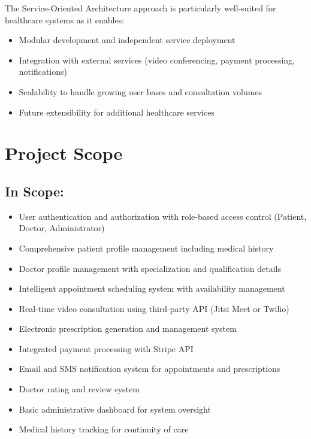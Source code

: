 \documentclass[11pt,a4paper]{article}
\begin{document}
The Service-Oriented Architecture approach is particularly well-suited for healthcare systems as it enables:
\begin{itemize}[leftmargin=*, itemsep=0.2em]
    \item Modular development and independent service deployment
    \item Integration with external services (video conferencing, payment processing, notifications)
    \item Scalability to handle growing user bases and consultation volumes
    \item Future extensibility for additional healthcare services
\end{itemize}

\section{Project Scope}

\subsection*{In Scope:}
\begin{itemize}[leftmargin=*, itemsep=0.1em]
    \item User authentication and authorization with role-based access control (Patient, Doctor, Administrator)
    \item Comprehensive patient profile management including medical history
    \item Doctor profile management with specialization and qualification details
    \item Intelligent appointment scheduling system with availability management
    \item Real-time video consultation using third-party API (Jitsi Meet or Twilio)
    \item Electronic prescription generation and management system
    \item Integrated payment processing with Stripe API
    \item Email and SMS notification system for appointments and prescriptions
    \item Doctor rating and review system
    \item Basic administrative dashboard for system oversight
    \item Medical history tracking for continuity of care
\end{itemize}
\end{document}
